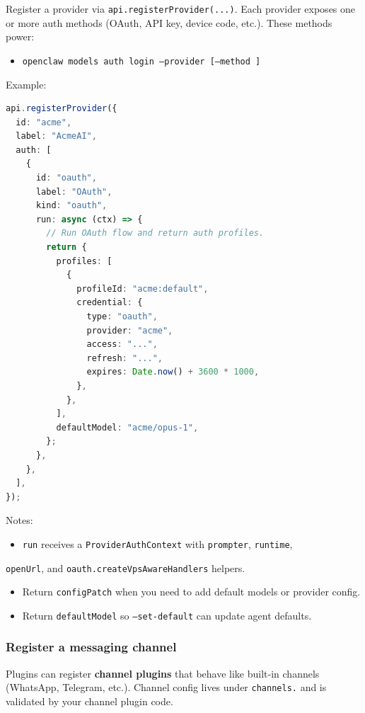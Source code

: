 Register a provider via \texttt{api.registerProvider(...)}. Each provider exposes one
or more auth methods (OAuth, API key, device code, etc.). These methods power:

\begin{itemize}
  \item \texttt{openclaw models auth login --provider  [--method ]}
\end{itemize}


Example:

\begin{lstlisting}[language=typescript]
api.registerProvider({
  id: "acme",
  label: "AcmeAI",
  auth: [
    {
      id: "oauth",
      label: "OAuth",
      kind: "oauth",
      run: async (ctx) => {
        // Run OAuth flow and return auth profiles.
        return {
          profiles: [
            {
              profileId: "acme:default",
              credential: {
                type: "oauth",
                provider: "acme",
                access: "...",
                refresh: "...",
                expires: Date.now() + 3600 * 1000,
              },
            },
          ],
          defaultModel: "acme/opus-1",
        };
      },
    },
  ],
});
\end{lstlisting}


Notes:

\begin{itemize}
  \item \texttt{run} receives a \texttt{ProviderAuthContext} with \texttt{prompter}, \texttt{runtime},
\end{itemize}

\texttt{openUrl}, and \texttt{oauth.createVpsAwareHandlers} helpers.
\begin{itemize}
  \item Return \texttt{configPatch} when you need to add default models or provider config.
  \item Return \texttt{defaultModel} so \texttt{--set-default} can update agent defaults.
\end{itemize}


\subsubsection{Register a messaging channel}


Plugins can register \textbf{channel plugins} that behave like built‑in channels
(WhatsApp, Telegram, etc.). Channel config lives under \texttt{channels.} and is
validated by your channel plugin code.

